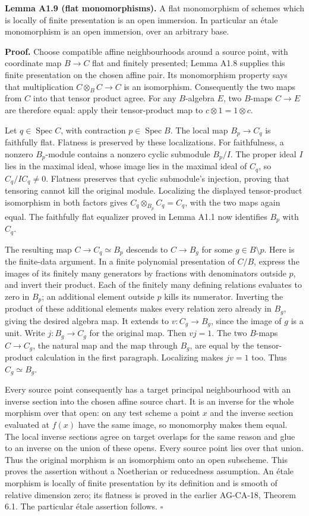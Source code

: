 \documentclass[11pt,a4paper,openany]{report}
\begin{document}
\textbf{Lemma A1.9 (flat monomorphisms).} A flat monomorphism of schemes which is locally of finite presentation is an open immersion. In particular an étale monomorphism is an open immersion, over an arbitrary base.

\textbf{Proof.} Choose compatible affine neighbourhoods around a source point, with coordinate map \(B\to C\) flat and finitely presented; Lemma A1.8 supplies this finite presentation on the chosen affine pair. Its monomorphism property says that multiplication \(C\otimes_B C\to C\) is an isomorphism. Consequently the two maps from \(C\) into that tensor product agree. For any \(B\)-algebra \(E\), two \(B\)-maps \(C\to E\) are therefore equal: apply their tensor-product map to \(c\otimes1=1\otimes c\).

Let \(q\in\operatorname{Spec}C\), with contraction \(p\in\operatorname{Spec}B\). The local map \(B_p\to C_q\) is faithfully flat. Flatness is preserved by these localizations. For faithfulness, a nonzero \(B_p\)-module contains a nonzero cyclic submodule \(B_p/I\). The proper ideal \(I\) lies in the maximal ideal, whose image lies in the maximal ideal of \(C_q\), so \(C_q/IC_q\ne0\). Flatness preserves that cyclic submodule's injection, proving that tensoring cannot kill the original module. Localizing the displayed tensor-product isomorphism in both factors gives \(C_q\otimes_{B_p}C_q=C_q\), with the two maps again equal. The faithfully flat equalizer proved in Lemma A1.1 now identifies \(B_p\) with \(C_q\).

The resulting map \(C\to C_q\simeq B_p\) descends to \(C\to B_g\) for some \(g\in B\setminus p\). Here is the finite-data argument. In a finite polynomial presentation of \(C/B\), express the images of its finitely many generators by fractions with denominators outside \(p\), and invert their product. Each of the finitely many defining relations evaluates to zero in \(B_p\); an additional element outside \(p\) kills its numerator. Inverting the product of these additional elements makes every relation zero already in \(B_g\), giving the desired algebra map. It extends to \(v:C_g\to B_g\), since the image of \(g\) is a unit. Write \(j:B_g\to C_g\) for the original map. Then \(vj=1\). The two \(B\)-maps \(C\to C_g\), the natural map and the map through \(B_g\), are equal by the tensor-product calculation in the first paragraph. Localizing makes \(jv=1\) too. Thus \(C_g\simeq B_g\).

Every source point consequently has a target principal neighbourhood with an inverse section into the chosen affine source chart. It is an inverse for the whole morphism over that open: on any test scheme a point \(x\) and the inverse section evaluated at \(f(x)\) have the same image, so monomorphy makes them equal. The local inverse sections agree on target overlaps for the same reason and glue to an inverse on the union of these opens. Every source point lies over that union. Thus the original morphism is an isomorphism onto an open subscheme. This proves the assertion without a Noetherian or reducedness assumption. An étale morphism is locally of finite presentation by its definition and is smooth of relative dimension zero; its flatness is proved in the earlier AG-CA-18, Theorem 6.1. The particular étale assertion follows. \(\square\)
\end{document}
